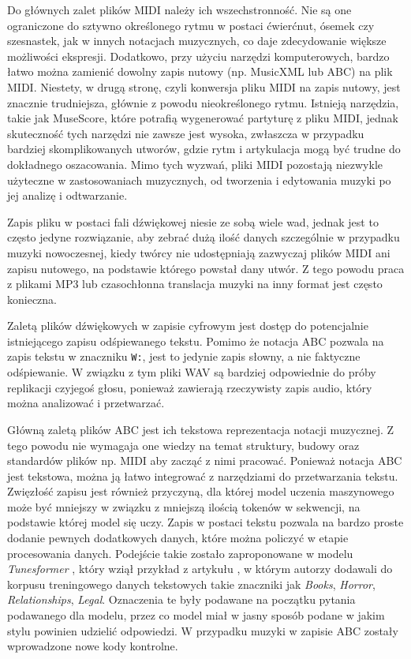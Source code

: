 \documentclass[data-science]{agh-wi} %
\begin{document}
Do głównych zalet plików MIDI należy ich wszechstronność. Nie są one ograniczone do sztywno określonego rytmu w postaci ćwierćnut, ósemek czy szesnastek, jak w innych notacjach muzycznych, co daje zdecydowanie większe możliwości ekspresji. Dodatkowo, przy użyciu narzędzi komputerowych, bardzo łatwo można zamienić dowolny zapis nutowy (np. MusicXML lub ABC) na plik MIDI. Niestety, w drugą stronę, czyli konwersja pliku MIDI na zapis nutowy, jest znacznie trudniejsza, głównie z powodu nieokreślonego rytmu. Istnieją narzędzia, takie jak MuseScore, które potrafią wygenerować partyturę z pliku MIDI, jednak skuteczność tych narzędzi nie zawsze jest wysoka, zwłaszcza w przypadku bardziej skomplikowanych utworów, gdzie rytm i artykulacja mogą być trudne do dokładnego oszacowania. Mimo tych wyzwań, pliki MIDI pozostają niezwykle użyteczne w zastosowaniach muzycznych, od tworzenia i edytowania muzyki po jej analizę i odtwarzanie.

Zapis pliku w postaci fali dźwiękowej niesie ze sobą wiele wad, jednak jest to często jedyne rozwiązanie, aby zebrać dużą ilość danych szczególnie w przypadku muzyki nowoczesnej, kiedy twórcy nie udostępniają zazwyczaj plików MIDI ani zapisu nutowego, na podstawie którego powstał dany utwór. Z tego powodu praca z plikami MP3 lub czasochłonna translacja muzyki na inny format jest często konieczna.

Zaletą plików dźwiękowych w zapisie cyfrowym jest dostęp do potencjalnie istniejącego zapisu odśpiewanego tekstu. Pomimo że notacja ABC pozwala na zapis tekstu w znaczniku \texttt{W:}, jest to jedynie zapis słowny, a nie faktyczne odśpiewanie. W związku z tym pliki WAV są bardziej odpowiednie do próby replikacji czyjegoś głosu, ponieważ zawierają rzeczywisty zapis audio, który można analizować i przetwarzać.

Główną zaletą plików ABC jest ich tekstowa reprezentacja notacji muzycznej. Z tego powodu nie wymagaja one wiedzy na temat struktury, budowy oraz standardów plików np. MIDI aby zacząć z nimi pracować. Ponieważ notacja ABC jest tekstowa, można ją łatwo integrować z narzędziami do przetwarzania tekstu. Zwięzłość zapisu jest również przyczyną, dla której model uczenia maszynowego może być mniejszy w związku z mniejszą ilością tokenów w sekwencji, na podstawie której model się uczy. Zapis w postaci tekstu pozwala na bardzo proste dodanie pewnych dodatkowych danych, które można policzyć w etapie procesowania danych. Podejście takie zostało zaproponowane w modelu \textit{Tunesformer} \cite{tunesformer}, który wziął przykład z artykułu \cite{keskarCTRL2019}, w którym autorzy dodawali do korpusu treningowego danych tekstowych takie znaczniki jak \textit{Books}, \textit{Horror}, \textit{Relationships}, \textit{Legal}. Oznaczenia te były podawane na początku pytania podawanego dla modelu, przez co model miał w jasny sposób podane w jakim stylu powinien udzielić odpowiedzi. W przypadku muzyki w zapisie ABC zostały wprowadzone nowe kody kontrolne.
\end{document}
